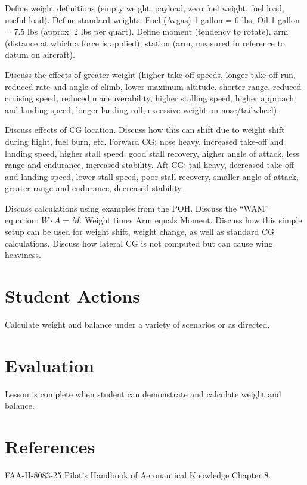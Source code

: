 \documentclass[twoside,openright]{report}
\begin{document}
Define weight definitions (empty weight, payload, zero fuel weight, fuel load,
useful load). Define standard weights: Fuel (Avgas) 1 gallon = 6 lbs, Oil 1
gallon = 7.5 lbs (approx. 2 lbs per quart). Define moment (tendency to rotate),
arm (distance at which a force is applied), station (arm, measured in reference
to datum on aircraft).

Discuss the effects of greater weight (higher take-off speeds, longer take-off
run, reduced rate and angle of climb, lower maximum altitude, shorter range,
reduced cruising speed, reduced maneuverability, higher stalling speed, higher
approach and landing speed, longer landing roll, excessive weight on
nose/tailwheel).

Discuss effects of CG location. Discuss how this can shift due to weight shift
during flight, fuel burn, etc. Forward CG: nose heavy, increased take-off and
landing speed, higher stall speed, good stall recovery, higher angle of attack,
less range and endurance, increased stability. Aft CG: tail heavy, decreased
take-off and landing speed, lower stall speed, poor stall recovery, smaller
angle of attack, greater range and endurance, decreased stability.

Discuss calculations using examples from the POH. Discuss the ``WAM'' equation:
$W \cdot A = M$. Weight times Arm equals Moment. Discuss how this simple setup
can be used for weight shift, weight change, as well as standard CG
calculations.  Discuss how lateral CG is not computed but can cause wing
heaviness.

\section{Student Actions}

Calculate weight and balance under a variety of scenarios or as directed.

\section{Evaluation}

Lesson is complete when student can demonstrate and calculate weight and balance.

\section{References}

FAA-H-8083-25 Pilot’s Handbook of Aeronautical Knowledge Chapter 8.
\end{document}
